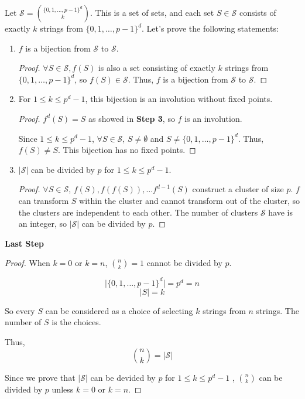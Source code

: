 Let $\mathcal{S} = { \{0,1, \dots, p-1\}^d \choose k }$. This is a set of sets, and each set $S \in \mathcal{S}$
consists of exactly $k$ strings from $\{0,1, \dots, p-1\}^d$. Let's prove the following statements: 
   \begin{enumerate}
   \item $f$ is a bijection from $\mathcal{S}$ to $\mathcal{S}$.
   \begin{proof}
   $\forall S \in \mathcal{S}, f(S)$ is also a set consisting of exactly $k$ strings from $\{0,1, \dots, p-1\}^d$, so $f(S) \in \mathcal{S}$. Thus, $f$ is a bijection from $\mathcal{S}$ to $\mathcal{S}$.
   \end{proof}
   \item For $1 \leq k \leq p^d-1$, this bijection is an involution without fixed points.
   \begin{proof}
   $f^d(S) = S$ as showed in \textbf{Step 3}, so $f$ is an involution.

   Since $1 \leq k \leq p^d - 1$, $\forall S \in \mathcal{S}$, $S \neq \emptyset$ and $S \neq \{0, 1, \dots, p-1\}^d$. Thus, $f(S) \neq S$. This bijection has no fixed points.

   \end{proof}
   \item $|\mathcal{S}|$ can be divided by $p$ for $1 \leq k \leq p^d - 1$.
   \begin{proof}
   $\forall S \in \mathcal{S}$, $f(S), f(f(S)), \dots f^{d-1}(S)$ construct a cluster of size $p$. $f$ can transform $S$ within the cluster and cannot transform out of the cluster, so the clusters are independent to each other. The number of clusters $\mathcal{S}$ have is an integer, so $\lvert \mathcal{S} \rvert$ can be divided by $p$.
   \end{proof}
   \end{enumerate}

   \textbf{Last Step}

\begin{proof}
When $k=0$ or $k=n$, ${n \choose k} = 1$ cannot be divided by $p$.

$$ \lvert \{0, 1, \dots, p-1\}^d \rvert = p^d = n $$
$$ \lvert S \rvert = k $$ 

So every $ S $ can be considered as a choice of selecting $k$ strings from $n$ strings. The number of $S$ is the choices.

Thus, $${n \choose k} = \lvert \mathcal{S} \rvert$$ 

Since we prove that $\lvert \mathcal{S} \rvert$ can be devided by $p$ for $1 \leq k \leq p^d - 1$ , ${n \choose k}$ can be divided by $p$ unless $k=0$ or $k=n$.
\end{proof}



